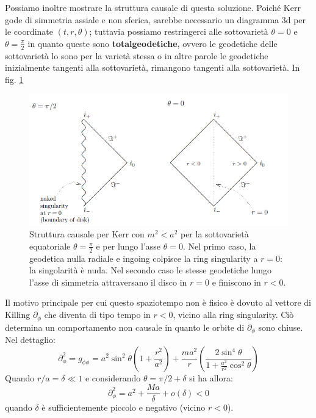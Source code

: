 Possiamo inoltre mostrare la struttura causale di questa soluzione. Poiché Kerr gode di simmetria assiale e non sferica, sarebbe necessario un diagramma 3d per le coordinate $(t,r,\theta)$; tuttavia possiamo restringerci alle sottovarietà $\theta = 0$ e $\theta = \frac{\pi}{2}$ in quanto queste sono \textbf{totalgeodetiche}, ovvero le geodetiche delle sottovarietà lo sono per la varietà stessa o in altre parole le geodetiche inizialmente tangenti alla sottovarietà, rimangono tangenti alla sottovarietà.
In fig. \ref{fig.kerr_causale_1}
\begin{figure}
    \centering
    \includegraphics[scale=0.7]{immagini/kerr_causale_1.png}
    \caption{Struttura causale per Kerr con $m^2 < a^2$ per la sottovarietà equatoriale $\theta = \frac{\pi}{2}$ e per lungo l'asse $\theta = 0$. Nel primo caso, la geodetica nulla radiale e ingoing colpisce la ring singularity a $r=0$: la singolarità è nuda. Nel secondo caso le stesse geodetiche lungo l'asse di simmetria attraversano il disco in $r=0$ e finiscono in $r<0$.}
    \label{fig.kerr_causale_1}
\end{figure}
Il motivo principale per cui questo spaziotempo non è fisico è dovuto al vettore di Killing $\partial_\phi$ che diventa di tipo tempo in $r<0$, vicino alla ring singularity. Ciò determina un comportamento non causale in quanto le orbite di $\partial_\phi$ sono chiuse. Nel dettaglio:
\begin{equation*}
    \partial^2_\phi = g_{\phi\phi} = a^2\sin^2\theta \left( 1 + \frac{r^2}{a^2}\right) + \frac{ma^2}{r}\left( \frac{2\sin^4\theta}{1 + \frac{a^2}{r^2}\cos^2\theta}\right) 
\end{equation*}
Quando $r/a = \delta \ll 1$ e considerando $\theta = \pi/2 + \delta$ si ha allora:
\begin{equation*}
    \partial^2_\phi = a^2 + \frac{Ma}{\delta} + o(\delta) < 0
\end{equation*}
quando $\delta$ è sufficientemente piccolo e negativo (vicino $r<0$).
